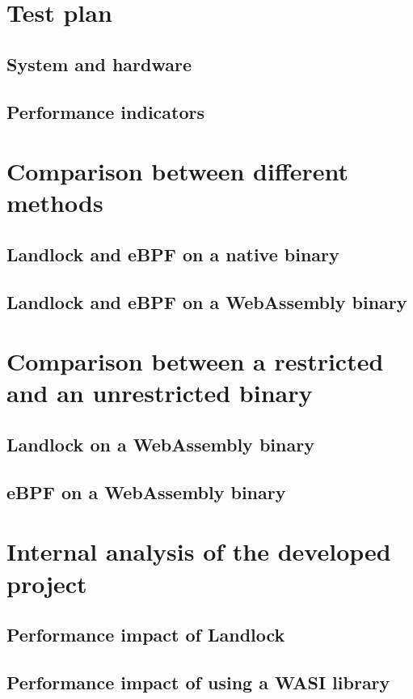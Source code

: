 \section{Test plan}

\subsection{System and hardware}

\subsection{Performance indicators}

\section{Comparison between different methods}

\subsection{Landlock and eBPF on a native binary}

\subsection{Landlock and eBPF on a WebAssembly binary}

\section{Comparison between a restricted and an unrestricted binary}

\subsection{Landlock on a WebAssembly binary}

\subsection{eBPF on a WebAssembly binary}

\section{Internal analysis of the developed project}

\subsection{Performance impact of Landlock}

\subsection{Performance impact of using a WASI library}